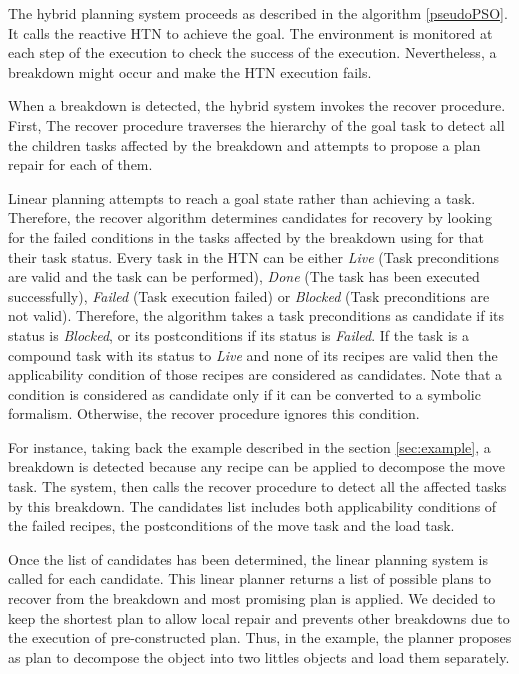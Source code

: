 \documentclass[conference]{IEEEtran}
\begin{document}
	\par The hybrid planning system proceeds as described in the algorithm  \ref{pseudoPSO}. It calls the reactive HTN  to achieve the goal. The environment is monitored at each step of the execution to check the success of the execution. Nevertheless, a breakdown might occur and make the  HTN execution fails. 
	\par When a breakdown is detected, the hybrid system invokes the recover procedure. First, The recover procedure traverses the hierarchy of the goal task to detect all the children tasks affected by the breakdown and attempts to propose a plan repair for each of them. %
	
	Linear planning attempts to reach a goal state rather than achieving a task. Therefore, the recover algorithm determines  candidates for recovery by looking for the failed conditions in the tasks affected by the breakdown using for that their task status. Every task in the HTN can be either \textit{Live} (Task preconditions are valid and the task can be performed), \textit{ Done} (The task has been executed successfully),  \textit{Failed} (Task execution failed) or \textit{Blocked}  (Task preconditions are not valid). Therefore, the algorithm takes a task preconditions as candidate if its status is  \textit{Blocked}, or its postconditions if its status is \textit{Failed}. If the task is a compound task with its status to \textit{Live} and none of its recipes are valid then the applicability condition of those recipes are considered as candidates. Note that a condition is considered as candidate only if it can be converted to a symbolic formalism. Otherwise, the recover procedure ignores this condition.   
	
	\par For instance, taking back the example described in the section \ref{sec:example}, a breakdown is detected because any recipe can be applied to decompose the move task. The system, then calls the recover procedure to detect all the affected tasks by this breakdown. The candidates list includes both applicability conditions of the failed recipes, the postconditions of the move task and the load task. 
	
	\par Once the list of candidates has been determined, the linear planning system is called for each candidate. This linear planner returns a list of possible plans to recover from the breakdown and most promising plan is applied. We decided to keep the shortest plan to allow local repair and prevents other breakdowns due to the execution of pre-constructed plan. Thus, in the example, the planner proposes as plan to decompose the object into two littles objects and load them separately.
	
\end{document}
